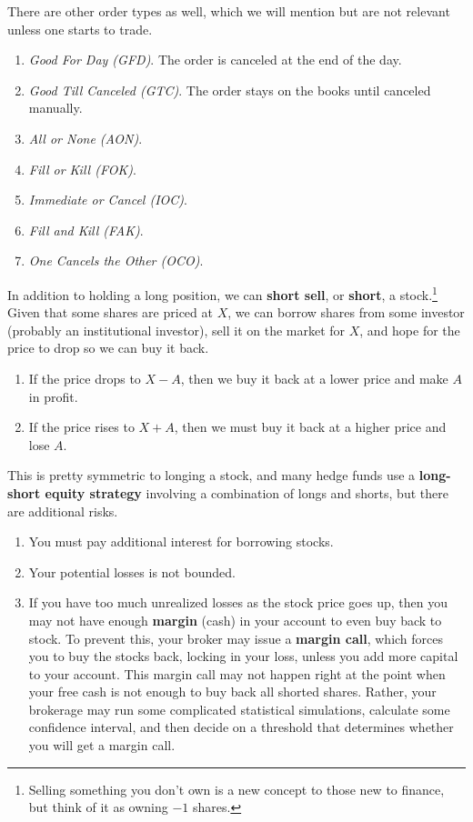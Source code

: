 \documentclass{article}
\begin{document}
    There are other order types as well, which we will mention but are not relevant unless one starts to trade. 
    \begin{enumerate}
      \item \textit{Good For Day (GFD)}. The order is canceled at the end of the day. 
      \item \textit{Good Till Canceled (GTC)}. The order stays on the books until canceled manually. 
      \item \textit{All or None (AON)}. 
      \item \textit{Fill or Kill (FOK)}.
      \item \textit{Immediate or Cancel (IOC)}. 
      \item \textit{Fill and Kill (FAK)}. 
      \item \textit{One Cancels the Other (OCO)}. 
    \end{enumerate}

    \begin{definition}
      \label{def:short-selling}
      In addition to holding a long position, we can \textbf{short sell}, or \textbf{short}, a stock.\footnote{Selling something you don't own is a new concept to those new to finance, but think of it as owning $-1$ shares. } Given that some shares are priced at $X$, we can borrow shares from some investor (probably an institutional investor), sell it on the market for $X$, and hope for the price to drop so we can buy it back. 
      \begin{enumerate}
        \item If the price drops to $X - A$, then we buy it back at a lower price and make $A$ in profit. 
        \item If the price rises to $X + A$, then we must buy it back at a higher price and lose $A$. 
      \end{enumerate}
    \end{definition}

    This is pretty symmetric to longing a stock, and many hedge funds use a \textbf{long-short equity strategy} involving a combination of longs and shorts, but there are additional risks. 
    \begin{enumerate}
      \item You must pay additional interest for borrowing stocks. 

      \item Your potential losses is not bounded. 

      \item If you have too much unrealized losses as the stock price goes up, then you may not have enough \textbf{margin} (cash) in your account to even buy back to stock. To prevent this, your broker may issue a \textbf{margin call}, which forces you to buy the stocks back, locking in your loss, unless you add more capital to your account. This margin call may not happen right at the point when your free cash is not enough to buy back all shorted shares. Rather, your brokerage may run some complicated statistical simulations, calculate some confidence interval, and then decide on a threshold that determines whether you will get a margin call. 
    \end{enumerate}
\end{document}
